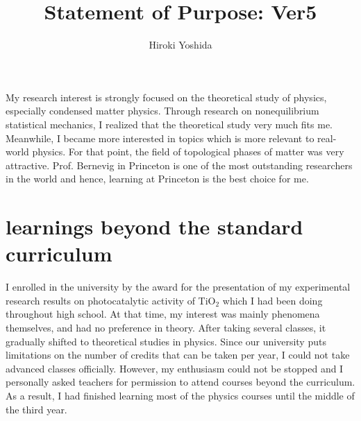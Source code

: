 \documentclass[a4]{article}
\title{Statement of Purpose: Ver5}
\author{Hiroki Yoshida}
\date{}
\begin{document}
\maketitle

My research interest is strongly focused on the theoretical study of physics, especially condensed matter physics. Through research on nonequilibrium statistical mechanics, I realized that the theoretical study very much fits me. Meanwhile, I became more interested in topics which is more relevant to real-world physics. For that point, the field of topological phases of matter was very attractive. Prof. Bernevig in Princeton is one of the most outstanding researchers in the world and hence, learning at Princeton is the best choice for me.\par

\section{learnings beyond the standard curriculum}
I enrolled in the university by the award for the presentation of my experimental research results on photocatalytic activity of TiO$_2$ which I had been doing throughout high school. At that time, my interest was mainly phenomena themselves, and had no preference in theory. After taking several classes, it gradually shifted to theoretical studies in physics. Since our university puts limitations on the number of credits that can be taken per year, I could not take advanced classes officially. However, my enthusiasm could not be stopped and I personally asked teachers for permission to attend courses beyond the curriculum. As a result, I had finished learning most of the physics courses until the middle of the third year.\par
\end{document}
